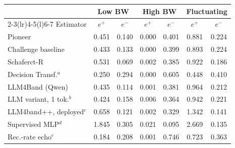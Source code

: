 \begin{tabular}{@{}l@{\hspace{4pt}}cc@{\hspace{6pt}}cc@{\hspace{6pt}}cc@{}}
\toprule
& \multicolumn{2}{c}{Low BW} & \multicolumn{2}{c}{High BW} & \multicolumn{2}{c}{Fluctuating} \\ \cmidrule(lr){2-3}\cmidrule(lr){4-5}\cmidrule(l){6-7}
Estimator & $e^{+}$ & $e^{-}$ & $e^{+}$ & $e^{-}$ & $e^{+}$ & $e^{-}$ \\
\midrule
Pioneer & 0.451 & 0.140 & 0.000 & 0.401 & 0.881 & 0.224 \\
Challenge baseline & 0.433 & 0.133 & 0.000 & 0.399 & 0.893 & 0.224 \\
Schaferct-R & 0.531 & 0.069 & 0.002 & 0.385 & 0.922 & 0.186 \\
Decision Transf.$^{a}$ & 0.250 & 0.294 & 0.000 & 0.605 & 0.448 & 0.410 \\
LLM4Band (Qwen) & 0.435 & 0.114 & 0.001 & 0.381 & 0.964 & 0.212 \\
LLM variant, 1 tok.$^{b}$ & 0.424 & 0.158 & 0.006 & 0.364 & 0.942 & 0.221 \\
LLM4band++, deployed$^{c}$ & 0.658 & 0.121 & 0.002 & 0.329 & 1.342 & 0.141 \\
\midrule
Supervised MLP$^{d}$ & 1.845 & 0.305 & 0.021 & 0.095 & 2.669 & 0.135 \\
Rec.-rate echo$^{e}$ & 0.184 & 0.208 & 0.001 & 0.746 & 0.723 & 0.363 \\
\bottomrule
\end{tabular}
